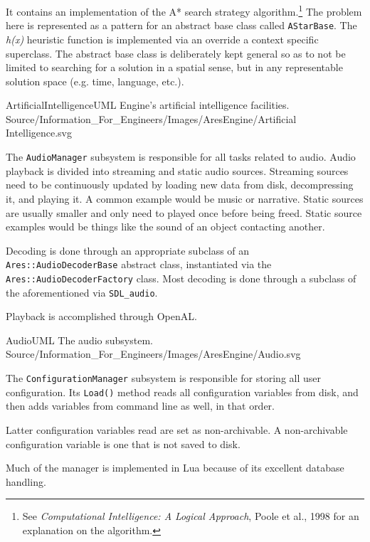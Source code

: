 It contains an implementation of the A* search strategy algorithm.\footnote{See {\it Computational Intelligence: A Logical Approach}, Poole et al., 1998 for an explanation on the algorithm.} The problem here is represented as a pattern for an abstract base class called {\tt AStarBase}. The {\it h(x)} heuristic function is implemented via an override a context specific superclass. The abstract base class is deliberately kept general so as to not be limited to searching for a solution in a spatial sense, but in any representable solution space (e.g. time, language, etc.).

\FullPageLandscapeDiagram
    {ArtificialIntelligenceUML}
    {Engine's artificial intelligence facilities.}
    {Source/Information_For_Engineers/Images/AresEngine/Artificial Intelligence.svg}

\page
{}
The {\tt AudioManager} subsystem is responsible for all tasks related to audio. Audio playback is divided into streaming and static audio sources. Streaming sources need to be continuously updated by loading new data from disk, decompressing it, and playing it. A common example would be music or narrative. Static sources are usually smaller and only need to played once before being freed. Static source examples would be things like the sound of an object contacting another.

Decoding is done through an appropriate subclass of an {\tt Ares::AudioDecoderBase} abstract class, instantiated via the {\tt Ares::AudioDecoderFactory} class. Most decoding is done through a subclass of the aforementioned via {\tt SDL_audio}.

Playback is accomplished through OpenAL.

\FullPageLandscapeDiagram
    {AudioUML}
    {The audio subsystem.}
    {Source/Information_For_Engineers/Images/AresEngine/Audio.svg}

\page
{}
The {\tt ConfigurationManager} subsystem is responsible for storing all user configuration. Its {\tt Load()} method reads all configuration variables from disk, and then adds variables from command line as well, in that order. 

Latter configuration variables read are set as non-archivable. A non-archivable configuration variable is one that is not saved to disk.

Much of the manager is implemented in Lua because of its excellent database handling.

